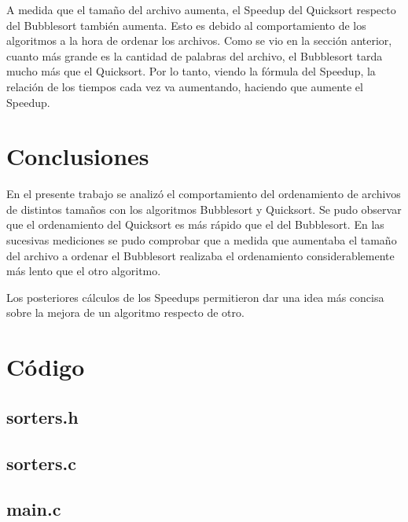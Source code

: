 \documentclass[a4paper,10pt]{article}
\begin{document}
\bigskip
A medida que el tamaño del archivo aumenta, el Speedup del Quicksort respecto del Bubblesort también aumenta. Esto es debido al comportamiento de los algoritmos a la hora de ordenar los archivos. Como se vio en la sección anterior, cuanto más grande es la cantidad de palabras del archivo, el Bubblesort tarda mucho más que el Quicksort. Por lo tanto, viendo la fórmula del Speedup, la relación de los tiempos cada vez va aumentando, haciendo que aumente el Speedup.



\newpage
\section{Conclusiones}
En el presente trabajo se analizó el comportamiento del ordenamiento de archivos de distintos tamaños con los algoritmos Bubblesort y Quicksort. Se pudo observar que el ordenamiento del Quicksort es más rápido que el del Bubblesort. En las sucesivas mediciones se pudo comprobar que a medida que aumentaba el tamaño del archivo a ordenar el Bubblesort realizaba el ordenamiento considerablemente más lento que el otro algoritmo.

Los posteriores cálculos de los Speedups permitieron dar una idea más concisa sobre la mejora de un algoritmo respecto de otro.



\newpage
\section{C\'odigo}

\subsection{sorters.h}
\lstset{ language = C, numbers=left, tabsize=4, breaklines=true, frame=single }


\bigskip
\subsection{sorters.c}
\lstset{ language = C, numbers=left, tabsize=4, breaklines=true, frame=single }


\bigskip
\subsection{main.c}
\lstset{ language = C, numbers=left, tabsize=4, breaklines=true, frame=single }

\end{document}
